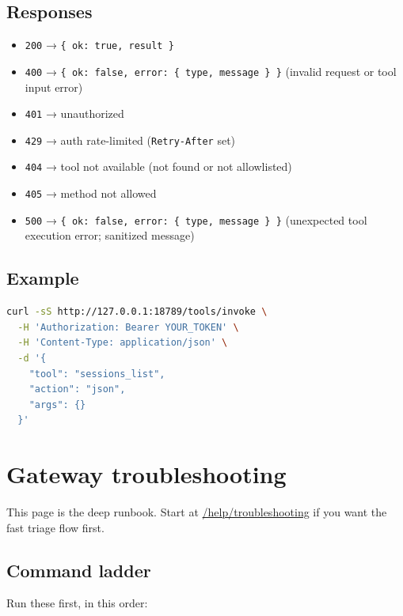 \subsection{Responses}


\begin{itemize}
  \item \texttt{200} → \texttt{\{ ok: true, result \}}
  \item \texttt{400} → \texttt{\{ ok: false, error: \{ type, message \} \}} (invalid request or tool input error)
  \item \texttt{401} → unauthorized
  \item \texttt{429} → auth rate-limited (\texttt{Retry-After} set)
  \item \texttt{404} → tool not available (not found or not allowlisted)
  \item \texttt{405} → method not allowed
  \item \texttt{500} → \texttt{\{ ok: false, error: \{ type, message \} \}} (unexpected tool execution error; sanitized message)
\end{itemize}


\subsection{Example}


\begin{lstlisting}[language=bash]
curl -sS http://127.0.0.1:18789/tools/invoke \
  -H 'Authorization: Bearer YOUR_TOKEN' \
  -H 'Content-Type: application/json' \
  -d '{
    "tool": "sessions_list",
    "action": "json",
    "args": {}
  }'
\end{lstlisting}



\clearpage

\section{Gateway troubleshooting}


This page is the deep runbook.
Start at \href{/help/troubleshooting}{/help/troubleshooting} if you want the fast triage flow first.

\subsection{Command ladder}


Run these first, in this order:

